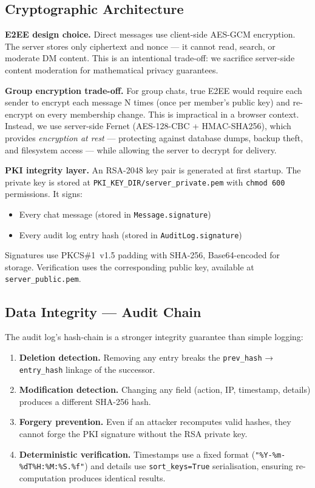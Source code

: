 \subsection{Cryptographic Architecture}

\textbf{E2EE design choice.} Direct messages use client-side AES-GCM encryption. The server stores only ciphertext and nonce — it cannot read, search, or moderate DM content. This is an intentional trade-off: we sacrifice server-side content moderation for mathematical privacy guarantees.

\textbf{Group encryption trade-off.} For group chats, true E2EE would require each sender to encrypt each message N times (once per member's public key) and re-encrypt on every membership change. This is impractical in a browser context. Instead, we use server-side Fernet (AES-128-CBC + HMAC-SHA256), which provides \emph{encryption at rest} — protecting against database dumps, backup theft, and filesystem access — while allowing the server to decrypt for delivery.

\textbf{PKI integrity layer.} An RSA-2048 key pair is generated at first startup. The private key is stored at \texttt{PKI\_KEY\_DIR/server\_private.pem} with \texttt{chmod 600} permissions. It signs:
\begin{itemize}[noitemsep]
    \item Every chat message (stored in \texttt{Message.signature})
    \item Every audit log entry hash (stored in \texttt{AuditLog.signature})
\end{itemize}

Signatures use PKCS\#1~v1.5 padding with SHA-256, Base64-encoded for storage. Verification uses the corresponding public key, available at \texttt{server\_public.pem}.

\subsection{Data Integrity — Audit Chain}

The audit log's hash-chain is a stronger integrity guarantee than simple logging:

\begin{enumerate}
    \item \textbf{Deletion detection.} Removing any entry breaks the \texttt{prev\_hash} → \texttt{entry\_hash} linkage of the successor.
    \item \textbf{Modification detection.} Changing any field (action, IP, timestamp, details) produces a different SHA-256 hash.
    \item \textbf{Forgery prevention.} Even if an attacker recomputes valid hashes, they cannot forge the PKI signature without the RSA private key.
    \item \textbf{Deterministic verification.} Timestamps use a fixed format (\texttt{"\%Y-\%m-\%dT\%H:\%M:\%S.\%f"}) and details use \texttt{sort\_keys=True} serialisation, ensuring re-computation produces identical results.
\end{enumerate}

